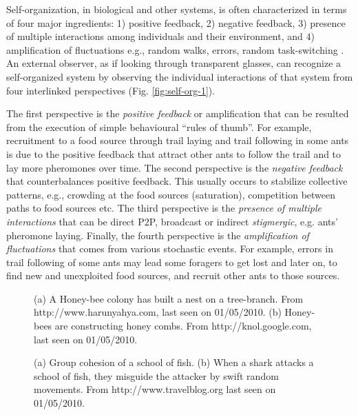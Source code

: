 Self-organization, in biological and  other systems, is often characterized in terms of four major ingredients: 1) positive feedback, 2) negative feedback, 3) presence of multiple interactions among individuals and their environment, and 4) amplification of fluctuations  e.g., random walks, errors, random task-switching \cite{Camazine+2001}. An external observer, as if looking through transparent glasses, can recognize a self-organized system by observing the individual interactions of that system from four interlinked perspectives (Fig. \ref{fig:self-org-1}). 

The first perspective is the {\em  positive feedback} or amplification that can be resulted from the execution of simple behavioural ``rules of thumb''. For example, recruitment to a food source through trail laying and trail following in some ants  is due to the positive feedback that attract other ants to follow the trail and to lay more pheromones over time. The second perspective is the {\em negative feedback} that counterbalances positive feedback. This usually occurs to stabilize collective patterns, e.g., crowding at the food sources (saturation), competition between paths to food sources etc. The third perspective is the {\em presence of multiple  interactions} that can be direct \acf{P2P}, broadcast or indirect {\em stigmergic}, e.g. ants' pheromone laying. Finally, the fourth  perspective is the {\em amplification of fluctuations} that comes from various stochastic events. For example, errors in trail following of some ants may lead some foragers to get lost and later on, to find new and unexploited food sources, and recruit other ants to those sources.
\begin{figure}[H]
\centering
{} 
\hspace{0.25cm}
\caption{(a) A Honey-bee colony has built a nest on a tree-branch. From http://www.harunyahya.com, last seen on 01/05/2010. (b) Honey-bees are constructing honey combs. From http://knol.google.com, last seen on 01/05/2010.}
\label{fig:honey-bee-nest}
\end{figure}
% 
\begin{figure}[H]
\centering
{} 
\hspace{0.25cm}
\caption{(a) Group cohesion of a school of fish. (b) When a shark attacks a school of fish, they misguide the attacker by swift random movements. From http://www.travelblog.org last seen on 01/05/2010.}
\label{fig:school-of-fish}
\end{figure}
